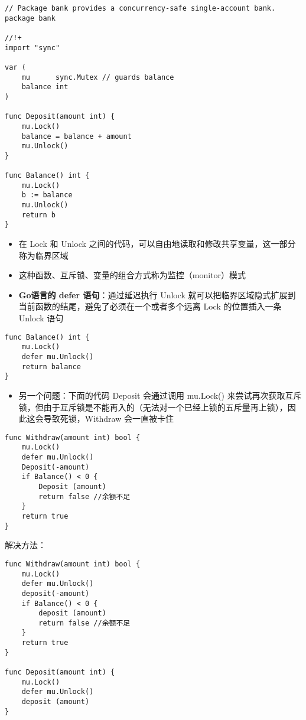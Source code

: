 \begin{verbatim}
// Package bank provides a concurrency-safe single-account bank.
package bank

//!+
import "sync"

var (
    mu      sync.Mutex // guards balance
    balance int
)

func Deposit(amount int) {
    mu.Lock()
    balance = balance + amount
    mu.Unlock()
}

func Balance() int {
    mu.Lock()
    b := balance
    mu.Unlock()
    return b
}
\end{verbatim}

\begin{itemize}
\tightlist
\item
  在 Lock 和 Unlock
  之间的代码，可以自由地读取和修改共享变量，这一部分称为临界区域
\item
  这种函数、互斥锁、变量的组合方式称为监控（monitor）模式
\item
  \textbf{Go语言的 defer 语句}：通过延迟执行 Unlock
  就可以把临界区域隐式扩展到当前函数的结尾，避免了必须在一个或者多个远离
  Lock 的位置插入一条 Unlock 语句
\end{itemize}

\begin{verbatim}
func Balance() int {
    mu.Lock()
    defer mu.Unlock()
    return balance
}
\end{verbatim}

\begin{itemize}
\tightlist
\item
  另一个问题：下面的代码 Deposit 会通过调用 mu.Lock()
  来尝试再次获取互斥锁，但由于互斥锁是不能再入的（无法对一个已经上锁的五斥量再上锁），因此这会导致死锁，Withdraw
  会一直被卡住
\end{itemize}

\begin{verbatim}
func Withdraw(amount int) bool {
    mu.Lock()
    defer mu.Unlock()
    Deposit(-amount)
    if Balance() < 0 {
        Deposit (amount)
        return false //余额不足
    }
    return true
}
\end{verbatim}

解决方法：

\begin{verbatim}
func Withdraw(amount int) bool {
    mu.Lock()
    defer mu.Unlock()
    deposit(-amount)
    if Balance() < 0 {
        deposit (amount)
        return false //余额不足
    }
    return true
}

func Deposit(amount int) {
    mu.Lock()
    defer mu.Unlock()
    deposit (amount)
}
\end{verbatim}

